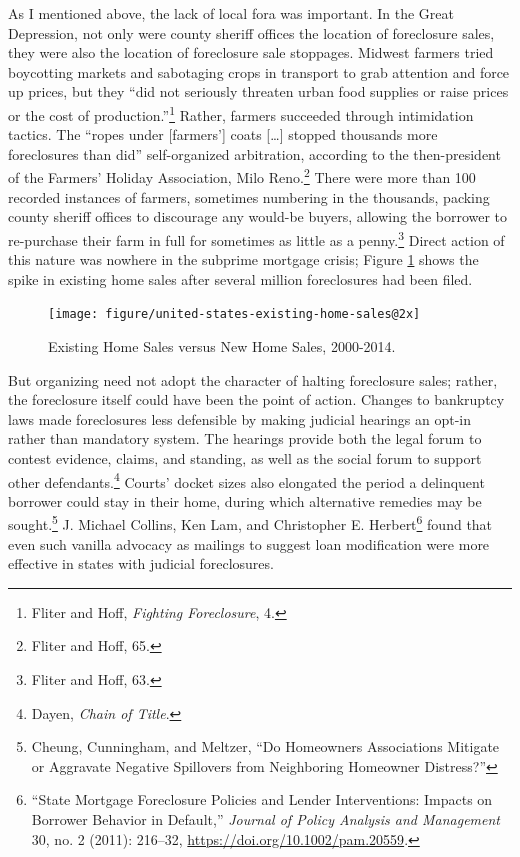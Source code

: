 \documentclass[12pt,oneside]{psthesis}
\begin{document}
As I mentioned above, the lack of local fora was important.
In the Great Depression, not only were county sheriff offices the location of foreclosure sales, they were also the location of foreclosure sale stoppages.
Midwest farmers tried boycotting markets and sabotaging crops in transport to grab attention and force up prices, but they ``did not seriously threaten urban food supplies or raise prices or the cost of production.''\footnote{Fliter and Hoff, \emph{Fighting Foreclosure}, 4.}
Rather, farmers succeeded through intimidation tactics.
The ``ropes under {[}farmers'{]} coats {[}\ldots{]} stopped thousands more foreclosures than did'' self-organized arbitration, according to the then-president of the Farmers' Holiday Association, Milo Reno.\footnote{Fliter and Hoff, 65.}
There were more than 100 recorded instances of farmers, sometimes numbering in the thousands, packing county sheriff offices to discourage any would-be buyers, allowing the borrower to re-purchase their farm in full for sometimes as little as a penny.\footnote{Fliter and Hoff, 63.}
Direct action of this nature was nowhere in the subprime mortgage crisis; Figure \ref{fig:tradingecon} shows the spike in existing home sales after several million foreclosures had been filed.
\begin{figure}

{\centering \texttt{[image: figure/united-states-existing-home-sales@2x]} 

}

\caption{Existing Home Sales versus New Home Sales, 2000-2014.}\label{fig:tradingecon}
\end{figure}
But organizing need not adopt the character of halting foreclosure sales; rather, the foreclosure itself could have been the point of action.
Changes to bankruptcy laws made foreclosures less defensible by making judicial hearings an opt-in rather than mandatory system.
The hearings provide both the legal forum to contest evidence, claims, and standing, as well as the social forum to support other defendants.\footnote{Dayen, \emph{Chain of Title}.}
Courts' docket sizes also elongated the period a delinquent borrower could stay in their home, during which alternative remedies may be sought.\footnote{Cheung, Cunningham, and Meltzer, ``Do Homeowners Associations Mitigate or Aggravate Negative Spillovers from Neighboring Homeowner Distress?''}
J. Michael Collins, Ken Lam, and Christopher E. Herbert\footnote{``State Mortgage Foreclosure Policies and Lender Interventions: Impacts on Borrower Behavior in Default,'' \emph{Journal of Policy Analysis and Management} 30, no. 2 (2011): 216--32, \url{https://doi.org/10.1002/pam.20559}.} found that even such vanilla advocacy as mailings to suggest loan modification were more effective in states with judicial foreclosures.
\end{document}
